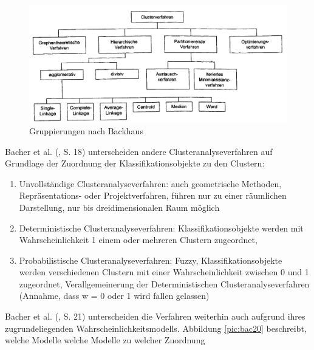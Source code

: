 \begin{figure}[h]
	\begin{center}
		\includegraphics[width=14cm]{pics/backhaus476.png}
	\end{center}
	\caption{Gruppierungen nach Backhaus}
	\label{pic:backhaus476}
\end{figure}

Bacher et al. (\cite{Bacher.2010}, S. 18) unterscheiden andere Clusteranalyseverfahren auf Grundlage der Zuordnung der Klassifikationsobjekte zu den Clustern:

\begin{enumerate}
	\item Unvollständige Clusteranalyseverfahren: auch geometrische Methoden, Repräsentations- oder Projektverfahren, führen nur zu einer räumlichen Darstellung, nur bis dreidimensionalen Raum möglich
	\item Deterministische Clusteranalyseverfahren: Klassifikationsobjekte werden mit Wahrscheinlichkeit 1 einem oder mehreren Clustern zugeordnet, 
	\item Probabilistische Clusteranalyseverfahren: Fuzzy, Klassifikationsobjekte werden verschiedenen Clustern mit einer Wahrscheinlichkeit zwischen 0 und 1 zugeordnet, Verallgemeinerung der Deterministischen Clusteranalyseverfahren (Annahme, dass w = 0 oder 1 wird fallen gelassen)
\end{enumerate}

Bacher et al. (\cite{Bacher.2010}, S. 21) unterscheiden die Verfahren weiterhin auch aufgrund ihres zugrundeliegenden Wahrscheinlichkeitsmodells. Abbildung \ref{pic:bac20} beschreibt, welche Modelle welche Modelle zu welcher Zuordnung

